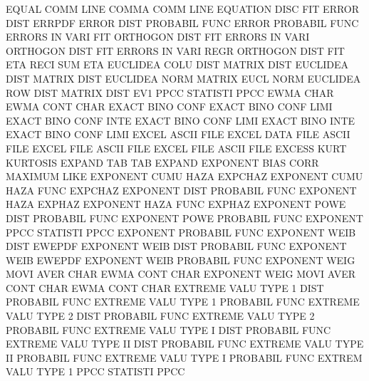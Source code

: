 EQUAL    COMM LINE                      COMMA    COMM LINE
EQUATION DISC                           FIT
ERROR    DIST                           ERRPDF
ERROR    DIST                           PROBABIL FUNC
ERROR                                   PROBABIL FUNC
ERRORS   IN   VARI FIT                  ORTHOGON DIST FIT
ERRORS   IN   VARI                      ORTHOGON DIST FIT
ERRORS   IN   VARI REGR                 ORTHOGON DIST FIT
ETA      RECI SUM                       ETA
EUCLIDEA COLU DIST                      MATRIX   DIST
EUCLIDEA DIST                           MATRIX   DIST
EUCLIDEA NORM                           MATRIX   EUCL NORM
EUCLIDEA ROW  DIST                      MATRIX   DIST
EV1      PPCC                           STATISTI PPCC
EWMA     CHAR                           EWMA     CONT CHAR
EXACT    BINO CONF                      EXACT    BINO CONF LIMI
EXACT    BINO CONF INTE                 EXACT    BINO CONF LIMI
EXACT    BINO INTE                      EXACT    BINO CONF LIMI
EXCEL                                   ASCII    FILE
EXCEL    DATA FILE                      ASCII    FILE
EXCEL    FILE                           ASCII    FILE
EXCEL    FILE                           ASCII    FILE
EXCESS   KURT                           KURTOSIS
EXPAND   TAB                            TAB      EXPAND
EXPONENT BIAS CORR                      MAXIMUM  LIKE
EXPONENT CUMU HAZA                      EXPCHAZ
EXPONENT CUMU HAZA FUNC                 EXPCHAZ
EXPONENT DIST                           PROBABIL FUNC
EXPONENT HAZA                           EXPHAZ
EXPONENT HAZA FUNC                      EXPHAZ
EXPONENT POWE DIST                      PROBABIL FUNC
EXPONENT POWE                           PROBABIL FUNC
EXPONENT PPCC                           STATISTI PPCC
EXPONENT                                PROBABIL FUNC
EXPONENT WEIB DIST                      EWEPDF
EXPONENT WEIB DIST                      PROBABIL FUNC
EXPONENT WEIB                           EWEPDF
EXPONENT WEIB                           PROBABIL FUNC
EXPONENT WEIG MOVI AVER CHAR            EWMA     CONT CHAR
EXPONENT WEIG MOVI AVER CONT CHAR       EWMA     CONT CHAR
EXTREME  VALU TYPE 1    DIST            PROBABIL FUNC
EXTREME  VALU TYPE 1                    PROBABIL FUNC
EXTREME  VALU TYPE 2    DIST            PROBABIL FUNC
EXTREME  VALU TYPE 2                    PROBABIL FUNC
EXTREME  VALU TYPE I    DIST            PROBABIL FUNC
EXTREME  VALU TYPE II   DIST            PROBABIL FUNC
EXTREME  VALU TYPE II                   PROBABIL FUNC
EXTREME  VALU TYPE I                    PROBABIL FUNC
EXTREM   VALU TYPE 1    PPCC            STATISTI PPCC
